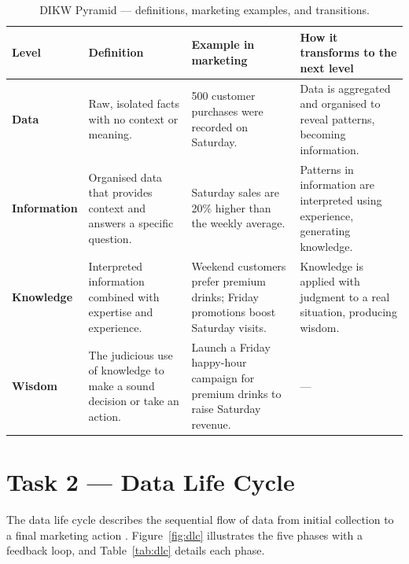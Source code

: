 \documentclass[12pt, a4paper]{article}
\newcommand{\Hcell}[1]{{\color{white}\textbf{#1}}}
\begin{document}
\begin{table}[ht]
\centering
\caption{DIKW Pyramid --- definitions, marketing examples, and transitions.}
\label{tab:dikw}
\small
\begin{tabularx}{\textwidth}{>{\bfseries}p{2.3cm} X X X}
\toprule
\rowcolor{aqHdr}
\Hcell{Level} &
\Hcell{Definition} &
\Hcell{Example in marketing} &
\Hcell{How it transforms to the next level} \\
\midrule
Data &
  Raw, isolated facts with no context or meaning. &
  500 customer purchases were recorded on Saturday. &
  Data is aggregated and organised to reveal patterns, becoming information. \\
\rowcolor{aqRow}
Information &
  Organised data that provides context and answers a specific question. &
  Saturday sales are 20\% higher than the weekly average. &
  Patterns in information are interpreted using experience, generating knowledge. \\
Knowledge &
  Interpreted information combined with expertise and experience. &
  Weekend customers prefer premium drinks; Friday promotions boost Saturday visits. &
  Knowledge is applied with judgment to a real situation, producing wisdom. \\
\rowcolor{aqRow}
Wisdom &
  The judicious use of knowledge to make a sound decision or take an action. &
  Launch a Friday happy-hour campaign for premium drinks to raise Saturday revenue. &
  --- \\
\bottomrule
\end{tabularx}
\end{table}

\newpage

\section{Task 2 --- Data Life Cycle}

The data life cycle describes the sequential flow of data from initial collection to a
final marketing action \cite{provost2013}. Figure~\ref{fig:dlc} illustrates the five
phases with a feedback loop, and Table~\ref{tab:dlc} details each phase.
\end{document}
